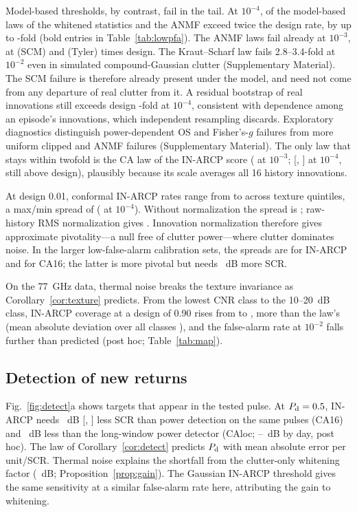 \documentclass[journal]{IEEEtran}
\begin{document}
Model-based thresholds, by contrast, fail in the tail. At $10^{-4}$, \NWhitenedLawsFail{} of the \NWhitenedLaws{} model-based laws of the whitened statistics and the ANMF exceed twice the design rate, by up to \LAnalMaxFour-fold (bold entries in Table~\ref{tab:lowpfa}). The ANMF laws fail already at $10^{-3}$, at \LScmThree{} (SCM) and \LFpThree{} (Tyler) times design. The Kraut--Scharf law fails 2.8--3.4-fold at $10^{-2}$ even in simulated compound-Gaussian clutter (Supplementary Material). The SCM failure is therefore already present under the model, and need not come from any departure of real clutter from it. A residual bootstrap of real innovations still exceeds design \LBootFour-fold at $10^{-4}$, consistent with dependence among an episode's innovations, which independent resampling discards. Exploratory diagnostics distinguish power-dependent OS and Fisher's-$g$ failures from more uniform clipped and ANMF failures (Supplementary Material). The only law that stays within twofold is the CA law of the IN-ARCP score (\LInAnalThree{} at $10^{-3}$; \LInAnalFour{} [\InAnalFourLo, \InAnalFourHi] at $10^{-4}$, still above design), plausibly because its scale averages all 16 history innovations.

At design 0.01, conformal IN-ARCP rates range from \QPfaINMin{} to \QPfaINMax{} across texture quintiles, a max/min spread of \QPfaINSpread{} (\LInConfSpreadFour{} at $10^{-4}$). Without normalization the spread is \QPfaUSpread; raw-history RMS normalization gives \QPfaRMSSpread. Innovation normalization therefore gives approximate pivotality---a null free of clutter power---where clutter dominates noise. In the larger low-false-alarm calibration sets, the spreads are \NetSpreadInIpix{} for IN-ARCP and \NetSpreadCaIpix{} for CA16; the latter is more pivotal but needs \DetINGainCAHalf~dB more SCR.

On the 77~GHz data, thermal noise breaks the texture invariance as Corollary~\ref{cor:texture} predicts. From the lowest CNR class to the 10--20~dB class, IN-ARCP coverage at a design of 0.90 rises from \JInLow{} to \JInHigh{}, more than the law's \JPredHigh{} (mean absolute deviation over all classes \JMae), and the false-alarm rate at $10^{-2}$ falls further than predicted (post hoc; Table~\ref{tab:map}).

\subsection{Detection of new returns}\label{sec:detect}
Fig.~\ref{fig:detect}a shows targets that appear in the tested pulse. At $P_{\rm d}=0.5$, IN-ARCP needs \DetINGainCAHalf~dB [\DetINGainCALoHalf, \DetINGainCAHiHalf] less SCR than power detection on the same pulses (CA16) and \DetINGainLocHalf~dB less than the long-window power detector (CAloc; \DayGainMin--\DayGainMax~dB by day, post hoc). The law of Corollary~\ref{cor:detect} predicts $P_{\rm d}$ with mean absolute error \DetMae{} per unit/SCR. Thermal noise explains the shortfall from the clutter-only whitening factor (\DetNaiveGain~dB; Proposition~\ref{prop:gain}). The Gaussian IN-ARCP threshold gives the same sensitivity at a similar false-alarm rate here, attributing the gain to whitening.
\end{document}
